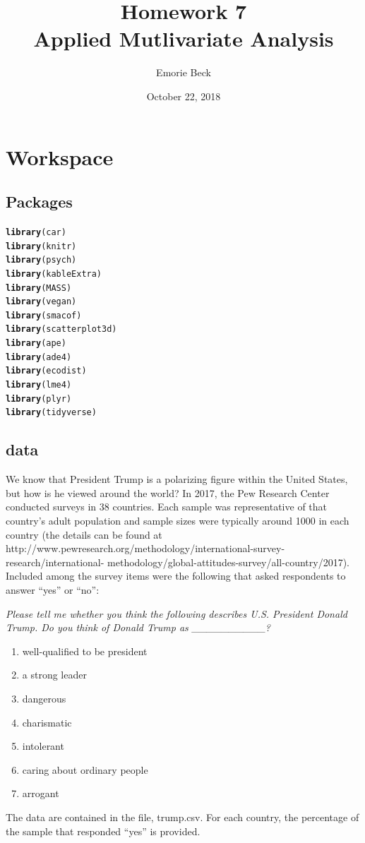 \documentclass{article}\usepackage[]{graphicx}\usepackage[]{color}
\title{%
Homework 7\\
\large Applied Mutlivariate Analysis}
\date{October 22, 2018}
\author{Emorie Beck}
\makeatletter
\newcommand{\hlstd}[1]{\textcolor[rgb]{0.345,0.345,0.345}{#1}}%
\newcommand{\hlkwd}[1]{\textcolor[rgb]{0.737,0.353,0.396}{\textbf{#1}}}%
\newenvironment{kframe}{%
 \def\at@end@of@kframe{}%
 \ifinner\ifhmode%
  \def\at@end@of@kframe{\end{minipage}}%
  \begin{minipage}{\columnwidth}%
 \fi\fi%
 \def\FrameCommand##1{\hskip\@totalleftmargin \hskip-\fboxsep
 \colorbox{shadecolor}{##1}\hskip-\fboxsep
     \hskip-\linewidth \hskip-\@totalleftmargin \hskip\columnwidth}%
 \MakeFramed {\advance\hsize-\width
   \@totalleftmargin\z@ \linewidth\hsize
   \@setminipage}}%
 {\par\unskip\endMakeFramed%
 \at@end@of@kframe}
\newenvironment{knitrout}{}{} %
\makeatother
\begin{document}
\maketitle

\section{Workspace}
\subsection{Packages}



\begin{knitrout}
\color{fgcolor}\begin{kframe}
\begin{alltt}
\hlkwd{library}\hlstd{(car)}
\hlkwd{library}\hlstd{(knitr)}
\hlkwd{library}\hlstd{(psych)}
\hlkwd{library}\hlstd{(kableExtra)}
\hlkwd{library}\hlstd{(MASS)}
\hlkwd{library}\hlstd{(vegan)}
\hlkwd{library}\hlstd{(smacof)}
\hlkwd{library}\hlstd{(scatterplot3d)}
\hlkwd{library}\hlstd{(ape)}
\hlkwd{library}\hlstd{(ade4)}
\hlkwd{library}\hlstd{(ecodist)}
\hlkwd{library}\hlstd{(lme4)}
\hlkwd{library}\hlstd{(plyr)}
\hlkwd{library}\hlstd{(tidyverse)}
\end{alltt}
\end{kframe}
\end{knitrout}



\subsection{data}
We know that President Trump is a polarizing figure within the United States, but how is he viewed around the world? In 2017, the Pew Research Center conducted surveys in 38 countries. Each sample was representative of that country’s adult population and sample sizes were typically around 1000 in each country (the details can be found at http://www.pewresearch.org/methodology/international-survey-research/international- methodology/global-attitudes-survey/all-country/2017). Included among the survey items were the following that asked respondents to answer “yes” or “no”:  

\textit{Please tell me whether you think the following describes U.S. President Donald Trump. Do you think of Donald Trump as \_\_\_\_\_\_\_\_\_\_?} 
\begin{enumerate}
\item well-qualified to be president
\item a strong leader
\item dangerous
\item charismatic
\item intolerant
\item caring about ordinary people
\item arrogant
\end{enumerate}
The data are contained in the file, trump.csv. For each country, the percentage of the sample that responded “yes” is provided.
\end{document}
